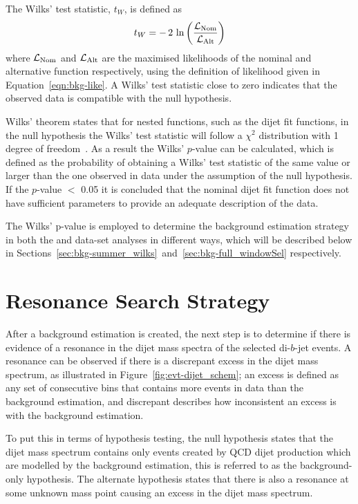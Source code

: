 \noindent
The Wilks' test statistic, $t_W$, is defined as
\begin{equation}
  t_{W} = -\,2\,\ln{\left(\frac{\ensuremath{\mathcal{L}}_{\text{Nom}}}{\ensuremath{\mathcal{L}}_{\text{Alt}}}\right)}  \label{eqn:bkg-wilks}
\end{equation}
where $\mathcal{L}_{\text{Nom}}$ and $\mathcal{L}_{\text{Alt}}$ are the maximised likelihoods of the nominal and alternative function respectively,
using the definition of likelihood given in Equation~\ref{eqn:bkg-like}.
A Wilks' test statistic close to zero indicates that the observed data is compatible with the null hypothesis.

Wilks' theorem states that for nested functions, such as the dijet fit functions,
in the null hypothesis the Wilks' test statistic will follow a $\chi^2$ distribution with 1 degree of freedom~\cite{dibjet-wilks}.
As a result the Wilks' $p$-value can be calculated, which is defined as the probability of obtaining a
Wilks' test statistic of the same value or larger than the one observed in data under the assumption of the null hypothesis.
If the \mbox{$p$-value} $<$ 0.05 it is concluded that the nominal dijet fit function does not have sufficient
parameters to provide an adequate description of the data.

The Wilks' p-value is employed to determine the background estimation strategy
in both the \summer{} and \lm{} data-set analyses in different ways,
which will be described below in Sections~\ref{sec:bkg-summer_wilks}~and~\ref{sec:bkg-full_windowSel} respectively.

\section{Resonance Search Strategy}
\label{sec:bkg-bh}

After a background estimation is created, the next step is to determine
if there is evidence of a resonance in the dijet mass spectra of the selected di-$b$-jet events.
A resonance can be observed if there is a discrepant excess in the dijet mass spectrum, as illustrated in Figure~\ref{fig:evt-dijet_schem};
an excess is defined as any set of consecutive bins that contains
more events in data than the background estimation,
and discrepant describes how inconsistent an excess is with the background estimation.

To put this in terms of hypothesis testing,
the null hypothesis states that the dijet mass spectrum contains only events created by QCD dijet production
which are modelled by the background estimation,
this is referred to as the background-only hypothesis.
The alternate hypothesis states that there is also a resonance at some
unknown mass point causing an excess in the dijet mass spectrum.

